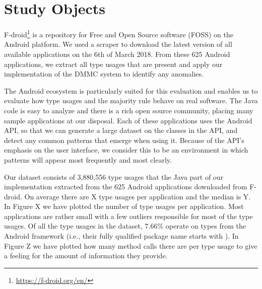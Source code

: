 \section{Study Objects} 

F-droid\footnote{\url{https://f-droid.org/en/}} is a repository for Free and Open Source software (FOSS) on the Android platform.
We used a scraper to download the latest version of all available applications on the 6th of March 2018.
From these 625 Android applications, we extract all type usages that are present and apply our implementation of the $\text{DMMC}$ system to identify any anomalies.

The Android ecosystem is particularly suited for this evaluation and enables us to evaluate how type usages and the majority rule behave on real software.
The Java code is easy to analyze and there is a rich open source community, placing many sample applications at our disposal.
Each of these applications uses the Android API, so that we can generate a large dataset on the classes in the API, and detect any common patterns that emerge when using it.
Because of the API's emphasis on the user interface, we consider this to be an environment in which patterns will appear most frequently and most clearly.

Our dataset consists of 3,880,556 type usages that the Java part of our implementation extracted from the 625 Android applications downloaded from F-droid.
On average there are X type usages per application and the median is Y.
In Figure X we have plotted the number of type usages per application.
Most applications are rather small with a few outliers responsible for most of the type usages.
Of all the type usages in the dataset, $7.66\%$ operate on types from the Android framework (i.e., their fully qualified package name starts with ).
In Figure Z we have plotted how many method calls there are per type usage to give a feeling for the amount of information they provide.

